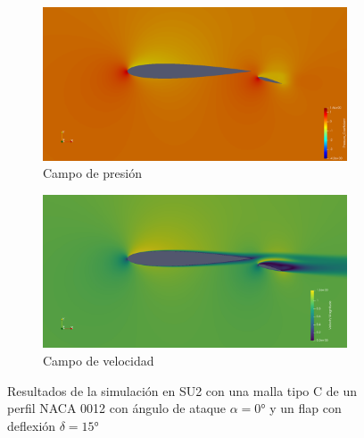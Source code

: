 \documentclass[letterpaper, openright, 12pt]{book}
\begin{document}
    \begin{figure}[htbp!]
        \centering
        \begin{subfigure}[c]{0.48\textwidth}
            \includegraphics[keepaspectratio, width=0.99\textwidth]
                {./img/su2/mc_flap_cp_alfa_0}
            \caption{Campo de presión}
            \label{fig:mc_flap_cp_0}
        \end{subfigure}
        \begin{subfigure}[c]{0.48\textwidth}
            \includegraphics[keepaspectratio, width=0.99\textwidth]
                {./img/su2/mc_flap_vel_alfa_0}
            \caption{Campo de velocidad}
            \label{fig:mc_flap_vel_0}
        \end{subfigure}
        \caption[Resultados de simulaciones para malla C con perfil y
            flap]{Resultados de la simulación en SU2 con una malla tipo C de
            un perfil NACA 0012 con ángulo de ataque $\alpha = 0\si{\degree}$ y
            un flap con deflexión $\delta = 15\si{\degree}$}
        \label{fig:mc_flap_su2_0}
    \end{figure}
\end{document}
